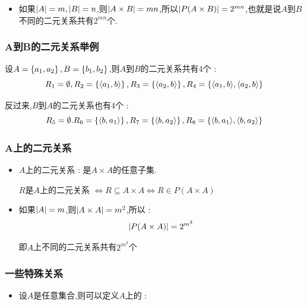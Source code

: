 {{{\begin{itemize}
{          $R$是$A$到$B$的二元关系$\Leftrightarrow R \subseteq A \times B \Leftrightarrow R \in \powerSetOf{A \times B}$
          }
    \item 如果$\left\lvert A \right\vert = m,\left\lvert B \right\vert = n$,则$\left\lvert A \times B \right\vert = mn$,所以$\left\lvert P(A \times B) \right\vert = 2^{mn}$,也就是说$A$到$B$不同的二元关系共有$2^{mn}$个.
  \end{itemize}
}%

\subsubsection{A到B的二元关系举例}{
  设$A = \left\{ a_1,a_2 \right\},B = \left\{ b_1,b_2 \right\}$,则$A$到$B$的二元关系共有4个 : $$
    R_1 = \emptyset,R_2 = \left\{ \langle a_1,b\rangle \right\},R_3 = \left\{ \langle a_2,b\rangle \right\},R_4 = \left\{ \langle a_1,b\rangle,\langle a_2,b\rangle \right\}
  $$

  反过来,$B$到$A$的二元关系也有4个 : $$
    R_5 = \emptyset.R_6 = \left\{ \langle b,a_1\rangle \right\},R_7 = \left\{ \langle b,a_2\rangle \right\},R_8 = \left\{ \langle b,a_1\rangle,\langle b,a_2\rangle \right\}
  $$
}%

\subsubsection{A上的二元关系}{
  \begin{itemize}
    \item {
          $A$上的二元关系 : 是$A \times A$的任意子集.

          $R$是$A$上的二元关系 $\Leftrightarrow R \subseteq A \times A \Leftrightarrow R \in P(A \times A)$
          }
    \item {
          如果$\left\lvert A \right\vert = m$,则$\left\lvert A \times A \right\vert = m^2$,所以 : $$
            \left\lvert P(A \times A) \right\vert = 2^{m^2}
          $$

          即$A$上不同的二元关系共有$2^{m^2}$个
          }
  \end{itemize}
}%

\subsubsection{一些特殊关系}{
  \begin{itemize}
    \item {
          设$A$是任意集合,则可以定义$A$上的 :

}
\end{itemize}}}}

